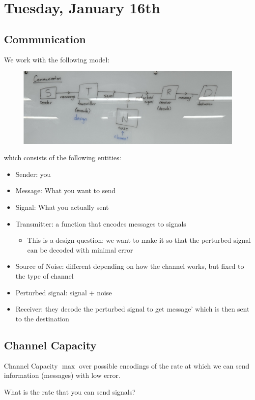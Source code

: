 \section{Tuesday, January 16th}
\subsection{Communication}
We work with the following model:
\begin{figure}[H]
    \centering
    \includegraphics[scale=0.18]{lectures/wk1/img/communication.png}
\end{figure}

which consists of the following entities:
\begin{itemize}
    \item Sender: you
    \item Message: What you want to send
    \item Signal: What you actually sent
    \item Transmitter: a function that encodes messages to signals
        \begin{itemize}
            \item This is a design question: we want to make it so that the perturbed signal can be decoded with minimal error
        \end{itemize}
    \item Source of Noise: different depending on how the channel works, but fixed to the type of channel
    \item Perturbed signal: signal + noise
    \item Receiver: they decode the perturbed signal to get message' which is then sent to the destination 
\end{itemize}

\subsection{Channel Capacity}
\begin{defn}{Channel Capacity}
$\max$ over possible encodings of the rate at which we can send information (messages) with low error.

What is the rate that you can send signals?
\end{defn}

